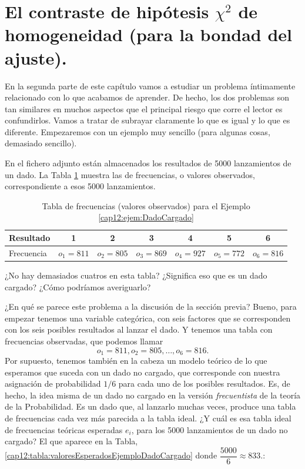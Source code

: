 \section{El contraste de hipótesis $\chi^2$ de homogeneidad (para la bondad del ajuste).}
\label{cap12:sec:ChiCuadradoHomgeneidad}

\noindent En la segunda parte de este capítulo vamos a estudiar un problema íntimamente relacionado con lo que acabamos de aprender. De hecho, los dos problemas son tan similares en muchos aspectos que el principal riesgo que corre el lector es confundirlos. Vamos a tratar de subrayar claramente lo que
es igual y lo que es diferente. Empezaremos con un ejemplo muy sencillo (para algunas cosas, demasiado sencillo).

\begin{ejemplo}
\label{cap12:ejem:DadoCargado}
En el fichero adjunto
 están
almacenados los resultados de 5000 lanzamientos de un dado. La Tabla \ref{cap12:tabla:valoresObservadosEjemploDadoCargado} muestra las de frecuencias, o valores observados,
correspondiente a esos 5000 lanzamientos.

\begin{table}[ht]
    \begin{center}
    \begin{tabular}{|l|c|c|c|c|c|c|}
      \hline
      Resultado & 1 & 2 & 3 & 4 & 5 & 6 \\
      \hline
      Frecuencia & $o_1=811$ & $o_2=805$ & $o_3=869$ & $o_4=927$ & $o_5=772$ & $o_6=816$\\
      \hline
    \end{tabular}
    \end{center}
\caption{Tabla de frecuencias (valores observados) para el Ejemplo \ref{cap12:ejem:DadoCargado}}
\label{cap12:tabla:valoresObservadosEjemploDadoCargado}
\end{table}

¿No hay demasiados cuatros en esta tabla? ¿Significa eso que es un dado cargado? ¿Cómo podríamos averiguarlo?

¿En qué se parece este problema a la discusión de la sección previa? Bueno, para empezar tenemos una variable categórica, con seis factores que se corresponden con los seis posibles resultados al lanzar el dado. Y tenemos una tabla con frecuencias observadas, que podemos llamar
        \[o_1=811, o_2=805,\ldots, o_6=816.\]
Por supuesto, tenemos también en la cabeza un {\sf modelo teórico} de lo que esperamos que suceda con un dado no cargado, que corresponde con  nuestra asignación de probabilidad $1/6$ para cada uno de los posibles resultados. Es, de hecho, la idea misma de un dado no cargado en la versión {\em frecuentista} de la teoría de la Probabilidad. Es un dado que, al lanzarlo muchas veces, produce una tabla de frecuencias cada vez más parecida a la tabla ideal. ¿Y cuál es esa tabla ideal de frecuencias teóricas esperadas $e_i$, para los 5000 lanzamientos de un dado no cargado? El que aparece en la Tabla, \ref{cap12:tabla:valoresEsperadosEjemploDadoCargado} donde $\dfrac{5000}{6}\approx 833$.:


\end{ejemplo}
